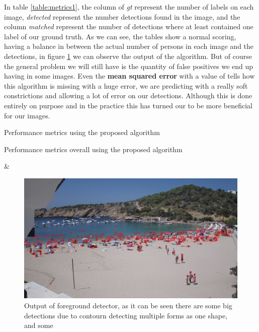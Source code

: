 \documentclass[10pt]{article}
\begin{document}
In table \ref{table:metrics1}, the column of \textit{gt} represent the number of labels on each image, \textit{detected} represent the number detections found in the image, and the column \textit{matched} represent the number of detections where at least contained one label of our ground truth. As we can see, the tables show a normal scoring, having a balance in between the actual number of persons in each image and the detections, in figure \ref*{fig:detections} we can observe the output of the algorithm. But of course the general problem we will still have is the quantity of false positives we end up having in some images. Even the \textbf{mean squared error} with a value of  tells how this algorithm is missing with a huge error, we are predicting with a really soft constrictions and allowing a lot of error on our detections. Although this is done entirely on purpose and in the practice this has turned our to be more beneficial for our images.\newline


\begin{table} [h]
  \centering
  \caption[Performance metrics Basic]{Performance metrics using the proposed algorithm}\label{table:metrics1}
\end{table}

\begin{table} [h]
  \centering
  \caption[Performance metrics overall]{Performance metrics overall using the proposed algorithm}\label{table:metrics_2}

  {\csvcoli & \csvcolii}%
\end{table}

\begin{figure}[h]
  \centering
  \includegraphics[width=\textwidth]{img/det_name.jpg}
  \caption{Output of foreground detector, as it can be seen there are some big detections due to contourn detecting multiple forms as one shape, and some }
  \label{fig:detections}
\end{figure}
\end{document}
